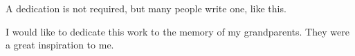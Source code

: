 A dedication is not required, but many people write one, like this.

I would like to dedicate this work to the memory of my grandparents.
They were a great inspiration to me.